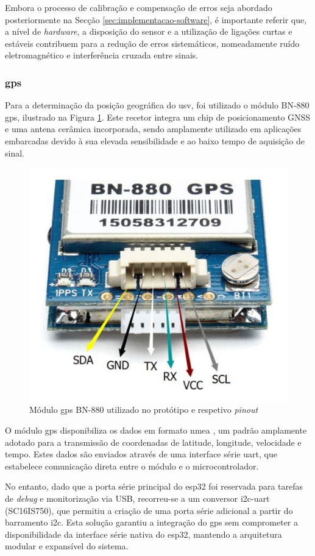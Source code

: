 Embora o processo de calibração e compensação de erros seja abordado posteriormente na Secção \ref{sec:implementacao-software}, é importante referir que, a nível de \emph{hardware}, a disposição do sensor e a utilização de ligações curtas e estáveis contribuem para a redução de erros sistemáticos, nomeadamente ruído eletromagnético e interferência cruzada entre sinais.  
    
\subsubsection{\acrfull{gps}}

Para a determinação da posição geográfica do \gls{usv}, foi utilizado o módulo BN-880 \gls{gps}, ilustrado na Figura \ref{fig:gps}. Este recetor integra um chip de posicionamento GNSS e uma antena cerâmica incorporada, sendo amplamente utilizado em aplicações embarcadas devido à sua elevada sensibilidade e ao baixo tempo de aquisição de sinal.  

\begin{figure}[H]
    \centering
    \includegraphics[width=0.4\linewidth]{figuras/BN-880-pinout.jpg}
    \caption{Módulo \gls{gps} BN-880 utilizado no protótipo e respetivo \emph{pinout}}
    \label{fig:gps}
\end{figure}

O módulo \gls{gps} disponibiliza os dados em formato \gls{nmea} \cite{nmea}, um padrão amplamente adotado para a transmissão de coordenadas de latitude, longitude, velocidade e tempo. Estes dados são enviados através de uma interface série \gls{uart}, que estabelece comunicação direta entre o módulo e o microcontrolador.  

No entanto, dado que a porta série principal do \gls{esp32} foi reservada para tarefas de \emph{debug} e monitorização via USB, recorreu-se a um conversor \gls{i2c}-\gls{uart} (SC16IS750), que permitiu a criação de uma porta série adicional a partir do barramento \gls{i2c}. Esta solução garantiu a integração do \gls{gps} sem comprometer a disponibilidade da interface série nativa do \gls{esp32}, mantendo a arquitetura modular e expansível do sistema.  

